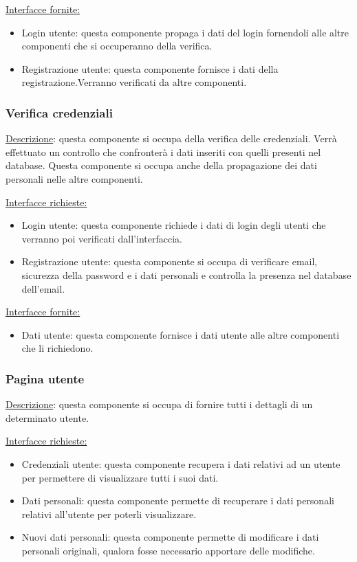 \documentclass[a4paper,12pt]{article}
\begin{document}
\underline{Interfacce fornite:} 
\begin{itemize}
    \item Login utente: questa componente propaga i dati del login fornendoli alle altre componenti che si occuperanno della verifica.
    \item Registrazione utente: questa componente fornisce i dati della registrazione.Verranno verificati da altre componenti.
\end{itemize} 



\subsubsection{Verifica credenziali}
\underline{Descrizione}: questa componente si occupa della verifica delle credenziali. Verrà effettuato un controllo che confronterà i dati inseriti con quelli presenti nel database. Questa componente si occupa anche della propagazione dei dati personali nelle altre componenti.

\underline{Interfacce richieste:} 
\begin{itemize}
    \item Login utente: questa componente richiede i dati di login degli utenti che verranno poi verificati dall'interfaccia.
    \item Registrazione utente: questa componente si occupa di verificare email, sicurezza della password e i dati personali e controlla la presenza nel database dell'email.   
\end{itemize}

\underline{Interfacce fornite:} 
\begin{itemize}
    \item Dati utente: questa componente fornisce i dati utente alle altre componenti che li richiedono.
\end{itemize} 



\subsubsection{Pagina utente}
\underline{Descrizione}: questa componente si occupa di fornire tutti i dettagli di un determinato utente.

\underline{Interfacce richieste:}
\begin{itemize}
\item Credenziali utente: questa componente recupera i dati relativi ad un utente per permettere di visualizzare tutti i suoi dati.
\item Dati personali: questa componente permette di recuperare i dati personali relativi all'utente per poterli visualizzare.
\item Nuovi dati personali: questa componente permette di modificare i dati personali originali, qualora fosse necessario apportare delle modifiche.
\end{itemize}
\end{document}
